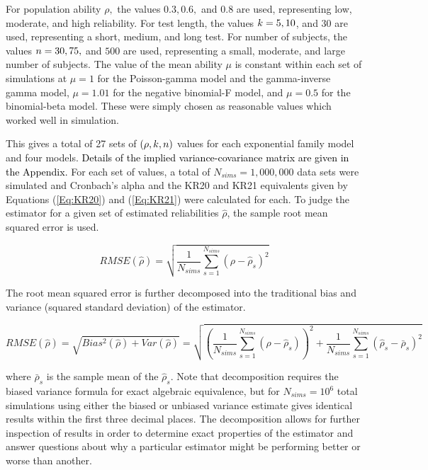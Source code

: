 \documentclass[12pt,epsfig]{article}
\newcommand{\changed}[1]{\textcolor{black}{#1}}
\newcommand{\numsubjects}{\changed{n}}%
\newcommand{\testlength}{\changed{k}}%
\begin{document}
For population ability $\rho,$ the values $0.3, 0.6,$ and $0.8$ are used, representing low, moderate, and high reliability. For test length, the values $\testlength = 5, 10$, and $30$ are used, representing a short, medium, and long test. For number of subjects, the values $\numsubjects = 30, 75,$ and $500$ are used, representing a small, moderate, and large number of subjects. The value of the mean ability $\mu$ is constant within each set of simulations at $\mu = 1$ for the Poisson-gamma model and the gamma-inverse gamma model, $\mu = 1.01$ for the negative binomial-F model, and $\mu = 0.5$ for the binomial-beta model. These were simply chosen as reasonable values which worked well in simulation. 

This gives a total of 27  sets of $(\rho, \testlength, \numsubjects)$ values for each exponential family model and four models. \changed{Details of the implied variance-covariance matrix are given in the Appendix.} For each set of values, a total of $N_{sims} = 1,000,000$ data sets were simulated and Cronbach's alpha and the KR20 and KR21 equivalents given by Equations (\ref{Eq:KR20}) and (\ref{Eq:KR21}) were calculated for each. To judge the estimator for a given set of estimated reliabilities $\hat{\rho}$, the sample root mean squared error is used.

\begin{equation*}
    RMSE(\hat{\rho}) = \sqrt{\dfrac{1}{N_{sims}} \displaystyle \sum_{s = 1}^{N_{sims}} (\rho - \hat{\rho}_{s})^2}
\end{equation*}

\noindent The root mean squared error is further decomposed into the traditional bias and variance (squared standard deviation) of the estimator.

\begin{equation*}
    RMSE(\hat{\rho})  = \sqrt{Bias^2(\hat{\rho})  + Var(\hat{\rho})} =  \sqrt{ \displaystyle \left(\dfrac{1}{N_{sims}} \sum_{s = 1}^{N_{sims}} (\rho - \hat{\rho}_{s})\right)^2 + \displaystyle \dfrac{1}{N_{sims}} \sum_{s = 1}^{N_{sims}} (\hat{\rho}_{s} - \bar{\rho}_s)^2}
\end{equation*}

\noindent where $\bar{\rho}_s$ is the sample mean of the $\hat{\rho}_s$.  Note that decomposition requires the biased variance formula for exact algebraic equivalence, but for $N_{sims} = 10^6$ total simulations using either the biased or unbiased variance estimate gives identical results within the first three decimal places. The decomposition allows for further inspection of results in order to determine exact properties of the estimator and answer questions about why a particular estimator might be performing better or worse than another. 
\end{document}
